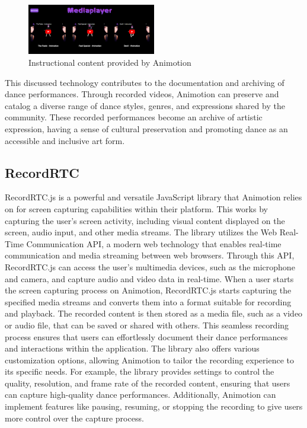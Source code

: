 \begin{figure}[htb]
  \centering
  \includegraphics[width=0.5\textwidth]{pics/exampleVids.png}
  \caption{Instructional content provided by Animotion}
  \label{fig:examplevids}
\end{figure}

This discussed technology contributes to the documentation and archiving of dance performances. Through recorded videos, Animotion can preserve and 
catalog a diverse range of dance styles, genres, and expressions shared by the community. These recorded performances become an archive of artistic expression, 
having a sense of cultural preservation and promoting dance as an accessible and inclusive art form.

\subsection{RecordRTC}
RecordRTC.js is a powerful and versatile JavaScript library that Animotion relies on for screen capturing capabilities within their platform.
This works by capturing the user's screen activity, including visual content displayed on the screen, audio input, 
and other media streams. The library utilizes the Web Real-Time Communication API, a modern web technology that enables real-time 
communication and media streaming between web browsers. Through this API, RecordRTC.js can access the user's multimedia devices, 
such as the microphone and camera, and capture audio and video data in real-time. \cite{rtcrecord}
When a user starts the screen capturing process on Animotion, RecordRTC.js starts capturing the specified media 
streams and converts them into a format suitable for recording and playback. The recorded content is then stored as a media file, 
such as a video or audio file, that can be saved or shared with others. This seamless recording process ensures that users can 
effortlessly document their dance performances and interactions within the application.
The library also offers various customization options, allowing Animotion to tailor the recording experience to its specific needs. 
For example, the library provides settings to control the quality, resolution, and frame rate of the recorded content, ensuring that 
users can capture high-quality dance performances. Additionally, Animotion can implement features like pausing, resuming, or 
stopping the recording to give users more control over the capture process. \cite{rtcrecord2}

